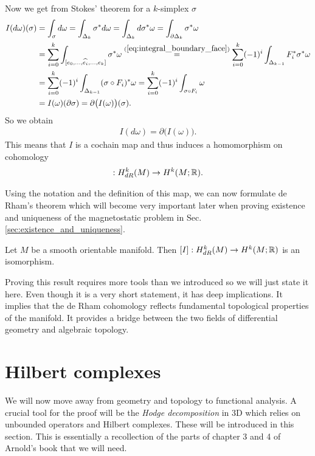 \documentclass[../master_thesis.tex]{subfiles}
\begin{document}
Now we get from Stokes' theorem for a $k$-simplex $\sigma$
\begin{align*}
    I(d\omega)(\sigma) &= \int_\sigma d\omega 
    = \int_{\Delta_k} \sigma^* d\omega 
    = \int_{\Delta_k} d\sigma^* \omega
    = \int_{\partial \Delta_k} \sigma^* \omega
    \\ &= \sum_{i=0}^k \int_{[e_0,...,\widehat{e_i}, ..., e_k]} \sigma^* \omega
    \stackrel{(\ref{eq:integral_boundary_face})}{=} \sum_{i=0}^{k} (-1)^i \int_{\Delta_{k-1}} F_i^*\sigma^* \omega
    \\ &= \sum_{i=0}^{k} (-1)^i \int_{\Delta_{k-1}} (\sigma\circ F_i)^* \omega
    = \sum_{i=0}^{k} (-1)^i \int_{\sigma\circ F_i} \omega
    \\ &= I(\omega)(\partial \sigma) = \partial \big(I(\omega)\big) (\sigma).
\end{align*}
So we obtain
\begin{align*}
    I(d\omega) = \partial \big(I(\omega)\big).
\end{align*}
This means that $I$ is a cochain map and thus 
induces a homomorphism on cohomology
\begin{align*}
    [I]:H^k_{dR}(M) \rightarrow H^k(M;\real).
\end{align*}

Using the notation and the definition of this map, we can now formulate 
de Rham's theorem which will become very important later when proving
existence and uniqueness of the magnetostatic problem in Sec.\,\ref{sec:existence_and_uniqueness}.
\begin{theorem}\label{thm:de_rhams_theorem}
    Let $M$ be a smooth orientable manifold. Then $[I]: H^k_{dR}(M) \rightarrow H^k(M;\mathbb{R})$ is an isomorphism.
\end{theorem}
Proving this result requires more tools than we introduced so we will just state it here. 
Even though it is a very short 
statement, it has deep implications. It implies that the de Rham cohomology
reflects fundamental topological properties of the manifold. It provides a bridge 
between the two fields of differential geometry and algebraic topology.

\section{Hilbert complexes}\label{sec:hilbert_complexes}
We will now move away from geometry and topology to functional analysis.
A crucial tool for the proof will be the \textit{Hodge decomposition} 
in 3D which relies on unbounded operators and Hilbert complexes. These 
will be introduced in this section. This is essentially a 
recollection of the parts of chapter 3 and 4 of Arnold's book \cite{arnold}
that we will need. 
\end{document}
